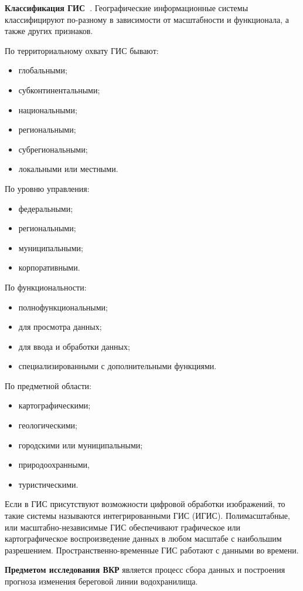 \documentclass[732,14pt,final]{studrep}
\begin{document}
\textbf{Классификация ГИС~\cite{gisclass}}.
Географические информационные системы классифицируют по-разному в зависимости от масштабности и функционала, а также других признаков.

По территориальному охвату ГИС бывают:
\begin{itemize}
\item глобальными;
\item субконтинентальными;
\item национальными;
\item региональными;
\item субрегиональными;
\item локальными или местными.
\end{itemize}

По уровню управления:
\begin{itemize}
\item федеральными;
\item региональными;
\item муниципальными;
\item корпоративными.
\end{itemize}

По функциональности:
\begin{itemize}
\item полнофункциональными;
\item для просмотра данных;
\item для ввода и обработки данных;
\item специализированными с дополнительными функциями.
\end{itemize}

По предметной области:
\begin{itemize}
\item картографическими;
\item геологическими;
\item городскими или муниципальными;
\item природоохранными,
\item туристическими.
\end{itemize}

Если в ГИС присутствуют возможности цифровой обработки изображений, то такие системы называются интегрированными ГИС (ИГИС). Полимасштабные, или масштабно-независимые ГИС обеспечивают графическое или картографическое воспроизведение данных в любом масштабе с наибольшим разрешением. Пространственно-временные ГИС работают с данными во времени.

\textbf{Предметом исследования ВКР} является процесс сбора данных и построения прогноза изменения береговой линии водохранилища.
\end{document}
